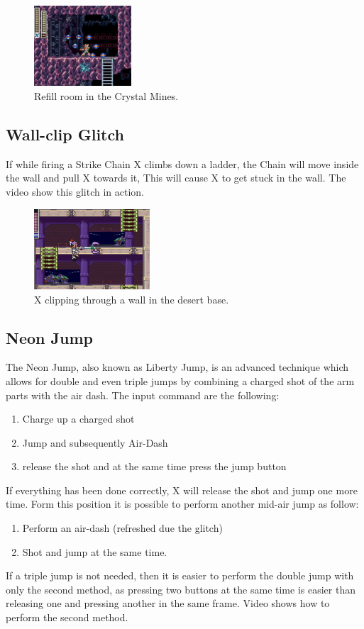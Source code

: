 \begin{itemize}
	\begin{figure}[htp]
		\centering
		\includegraphics[height=3cm]{figures/X2/Crystal_snail/Crystal_farming_spot.png}
		\caption{Refill room in the Crystal Mines.}
	\end{figure}
\end{itemize}

\subsection{Wall-clip Glitch}
If while firing a Strike Chain X climbs down a ladder, the Chain will move inside the wall and pull X towards it, This will cause X to get stuck in the wall. The video  show this glitch in action.

\begin{figure}[htp]
	\centering
	\includegraphics[height=3cm]{figures/X2/Miscs/Chain_clip.jpg}
	\caption{X clipping through a wall in the desert base.}
\end{figure}

\subsection{Neon Jump}\label{Neon_jump}
The Neon Jump, also known as Liberty Jump, is an advanced technique which allows for double and even triple jumps by combining a charged shot of the arm parts with the air dash. The input command are the following:
\begin{enumerate}
	\item Charge up a charged shot
	\item Jump and subsequently Air-Dash 
	\item release the shot and at the same time press the jump button
\end{enumerate}
If everything has been done correctly, X will release the shot and jump one more time. Form this position it is possible to perform another mid-air jump as follow:
\begin{enumerate}
	\item Perform an air-dash (refreshed due the glitch)
	\item Shot and jump at the same time.
\end{enumerate}
If a triple jump is not needed, then it is easier to perform the double jump with only the second method, as pressing two buttons at the same time is easier than releasing one and pressing another in the same frame. Video  shows how to perform the second method.

